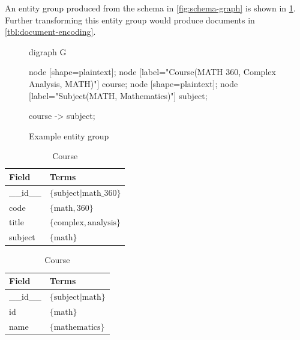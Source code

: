 		\begin{ex}
			An entity group produced from the schema in \cref{fig:schema-graph} is shown in \cref{fig:entity-group}.  Further transforming this entity group would produce documents in \cref{tbl:document-encoding}.
			
			\begin{figure}
				\centering
				
				\begin{dot2tex}[dot]
					digraph G {
						node [shape=plaintext]; {node [label="Course(MATH 360, Complex Analysis, MATH)"] course;}
						node [shape=plaintext]; {node [label="Subject(MATH, Mathematics)"] subject;}
						
						course -> subject;
					}
				\end{dot2tex}
				
				\caption{Example entity group}
				\label{fig:entity-group}
			\end{figure}
			
			\begin{table}
				\begin{subtable}[b]{0.33\linewidth}
					\centering
					
					\begin{tabular}{ll}
						\toprule
						Field & Terms \\
						\midrule
						\_\_id\_\_ & \(\{\text{subject|math\_360}\}\) \\
						code & \(\{\text{math}, \text{360}\}\) \\
						title & \(\{\text{complex}, \text{analysis}\}\) \\
						subject & \(\{\text{math}\}\) \\
						\bottomrule
					\end{tabular}
					
					\caption{Course}
				\end{subtable}
				\begin{subtable}[b]{0.33\linewidth}
					\centering
					
					\begin{tabular}{ll}
						\toprule
						Field & Terms \\
						\midrule
						\_\_id\_\_ & \(\{\text{subject|math}\}\) \\
						id & \(\{\text{math}\}\) \\
						name & \(\{\text{mathematics}\}\) \\
						\bottomrule
					\end{tabular}
					

\end{subtable}
\end{table}
\end{ex}
